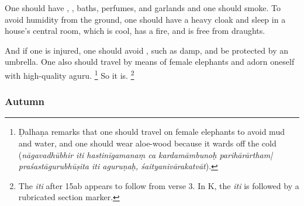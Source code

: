 \begin{translation}
	\item[13--14ab] %
	One should have , , baths, perfumes, and garlands and one should smoke. To avoid humidity from the ground, one should have a heavy cloak and sleep in a house's central room, which is cool, has a fire, and is free from draughts.

	\item[14c–f] %
	And if one is injured, one should avoid , such as damp, and be protected by an umbrella. One also should travel by means of female elephants and adorn oneself with high-quality \gls{aguru}.%
	\footnote{Ḍalhaṇa \citep[809]{vulgate} remarks that one should travel on female elephants to avoid mud and water, and one should wear aloe-wood because it wards off the cold (\emph{nāgavadhūbhir iti hastinīgamanaṃ ca kardamāmbunoḥ parihārārtham| praśastāgurubhūṣita iti aguruṇaḥ, śaityanivārakatvāt}).} %
	So it is.%
	\footnote{The \emph{iti} after 15ab appears to follow from verse 3. In K, the \emph{iti} is followed by a rubricated section marker.}\\


	\subsubsection{Autumn} %


\end{translation}
